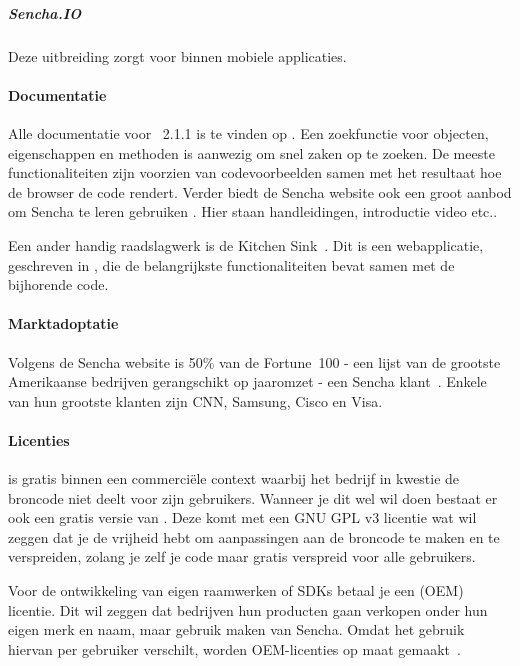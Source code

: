 \subparagraph{Sencha.IO}
Deze uitbreiding zorgt voor  binnen mobiele applicaties.  

\paragraph{Documentatie}
Alle documentatie voor \st{}~2.1.1 is te vinden op .  
Een zoekfunctie voor objecten,  eigenschappen en methoden is aanwezig om snel zaken op te zoeken.  
De meeste functionaliteiten zijn voorzien van codevoorbeelden samen met het resultaat hoe de browser de code rendert.  
Verder biedt de Sencha website ook een groot aanbod om Sencha te leren gebruiken .  
Hier staan handleidingen,  introductie video etc..

Een ander handig raadslagwerk is de Kitchen Sink~\cite{Inc.2013}.  
Dit is een webapplicatie,  geschreven in \st{},  die de belangrijkste functionaliteiten bevat samen met de bijhorende code.  

\paragraph{Marktadoptatie}
Volgens de Sencha website is 50\% van de Fortune~100 - een lijst van de grootste Amerikaanse bedrijven gerangschikt op jaaromzet - een Sencha klant~\cite{Inc.}.  
Enkele van hun grootste klanten zijn CNN,  Samsung,  Cisco en  Visa.

\paragraph{Licenties}
\st{} is gratis binnen een commerciële context waarbij het bedrijf in kwestie de broncode niet deelt voor zijn gebruikers.  
Wanneer je dit wel wil doen bestaat er ook een gratis  versie van \st{}.  
Deze komt met een GNU GPL v3  licentie wat wil zeggen dat je de vrijheid hebt om aanpassingen aan de broncode te maken en te verspreiden,  zolang je zelf je code maar gratis verspreid voor alle gebruikers.
  
Voor de ontwikkeling van eigen raamwerken of SDKs betaal je een  (OEM) licentie.  
Dit wil zeggen dat bedrijven hun producten gaan verkopen onder hun eigen merk en naam, maar gebruik maken van Sencha.  
Omdat het gebruik hiervan per gebruiker verschilt,  worden OEM-licenties op maat gemaakt~\cite{Inc.}.

